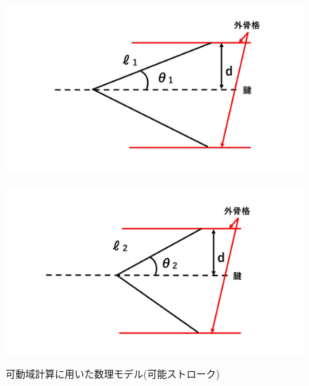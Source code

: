 %
\begin{figure}[htbp]
  \begin{minipage}{0.49\hsize}
    \centering  
    \includegraphics[scale=0.23]{image/model_2_open.jpg}
    \label{fig:model_2_before}
  \end{minipage}
  \begin{minipage}{0.49\hsize}
    \centering
    \includegraphics[scale=0.23]{image/model_2_close.jpg}
    \label{fig:model_2_after}
  \end{minipage}
  \caption{可動域計算に用いた数理モデル(可能ストローク)}
  \label{fig:model_2}
\end{figure}
